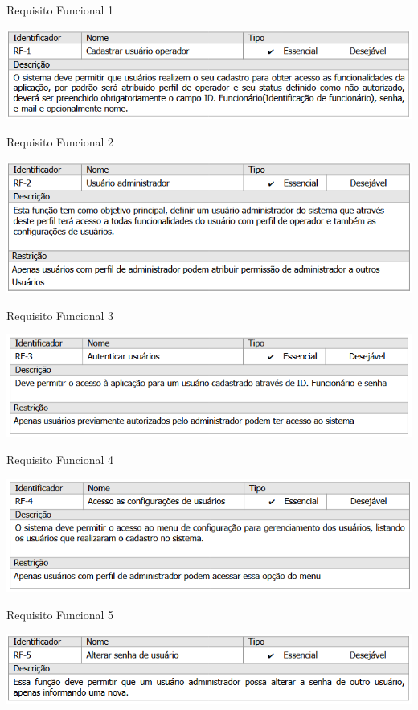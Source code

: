 \begin{table}[H]\label{tab:rf01}
    \caption{Requisito Funcional 1}
    \centering
    \includegraphics[scale=0.9]{imagens/rf01.png}
\end{table}
\begin{table}[H]\label{tab:rf02}
    \caption{Requisito Funcional 2}
    \centering
    \includegraphics[scale=0.9]{imagens/rf02.png}
\end{table}
\begin{table}[H]\label{tab:rf03}
    \caption{Requisito Funcional 3}
    \centering
    \includegraphics[scale=0.9]{imagens/rf03.png}
\end{table}
\begin{table}[H]\label{tab:rf04}
    \caption{Requisito Funcional 4}
    \centering
    \includegraphics[scale=0.9]{imagens/rf04.png}
\end{table}
\begin{table}[H]\label{tab:rf05}
    \caption{Requisito Funcional 5}
    \centering
    \includegraphics[scale=0.9]{imagens/rf05.png}
\end{table}
